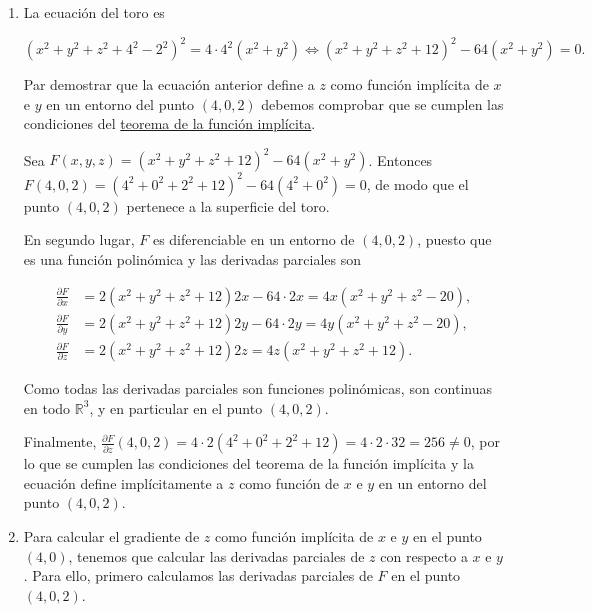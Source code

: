 \documentclass[
  spanish,
  a4paper,
]{scrreport}
\theoremstyle{definition}
\theoremstyle{remark}
\begin{document}
\begin{tcolorbox}[enhanced jigsaw, arc=.35mm, bottomrule=.15mm, bottomtitle=1mm, breakable, colback=white, colbacktitle=quarto-callout-tip-color!10!white, colframe=quarto-callout-tip-color-frame, coltitle=black, left=2mm, leftrule=.75mm, opacityback=0, opacitybacktitle=0.6, rightrule=.15mm, title=\textcolor{quarto-callout-tip-color}{\faLightbulb}\hspace{0.5em}{Solución}, titlerule=0mm, toprule=.15mm, toptitle=1mm]

\begin{enumerate}
\def\labelenumi{\alph{enumi}.}
\item
  La ecuación del toro es

  \[
  (x^2+y^2+z^2+4^2-2^2)^2 = 4\cdot 4^2(x^2+y^2) \Leftrightarrow (x^2+y^2+z^2+12)^2 - 64(x^2+y^2) = 0.
  \]

  Par demostrar que la ecuación anterior define a \(z\) como función
  implícita de \(x\) e \(y\) en un entorno del punto \((4,0,2)\) debemos
  comprobar que se cumplen las condiciones del
  \href{https://aprendeconalf.es/analisis-manual/13-derivadas-funciones-varias-variables.html\#thm-funcion-implicita}{teorema
  de la función implícita}.

  Sea \(F(x,y,z) = (x^2+y^2+z^2+12)^2 - 64(x^2+y^2)\). Entonces
  \(F(4,0,2) = (4^2+0^2+2^2+12)^2 - 64(4^2+0^2) = 0\), de modo que el
  punto \((4, 0, 2)\) pertenece a la superficie del toro.

  En segundo lugar, \(F\) es diferenciable en un entorno de \((4,0,2)\),
  puesto que es una función polinómica y las derivadas parciales son

  \begin{align*}
  \frac{\partial F}{\partial x} 
  &= 2(x^2+y^2+z^2+12)2x - 64\cdot 2x 
  = 4x(x^2+y^2+z^2-20), \\
  \frac{\partial F}{\partial y}
  &= 2(x^2+y^2+z^2+12)2y - 64\cdot 2y
  = 4y(x^2+y^2+z^2-20), \\
  \frac{\partial F}{\partial z}
  &= 2(x^2+y^2+z^2+12)2z
  = 4z(x^2+y^2+z^2+12).
  \end{align*}

  Como todas las derivadas parciales son funciones polinómicas, son
  continuas en todo \(\mathbb{R}^3\), y en particular en el punto
  \((4,0,2)\).

  Finalmente,
  \(\frac{\partial F}{\partial z}(4,0,2) = 4\cdot 2(4^2+0^2+2^2+12) = 4\cdot 2\cdot 32 = 256 \neq 0\),
  por lo que se cumplen las condiciones del teorema de la función
  implícita y la ecuación define implícitamente a \(z\) como función de
  \(x\) e \(y\) en un entorno del punto \((4,0,2)\).
\item
  Para calcular el gradiente de \(z\) como función implícita de \(x\) e
  \(y\) en el punto \((4,0)\), tenemos que calcular las derivadas
  parciales de \(z\) con respecto a \(x\) e \(y\). Para ello, primero
  calculamos las derivadas parciales de \(F\) en el punto \((4,0,2)\).


\end{enumerate}
\end{tcolorbox}
\end{document}
